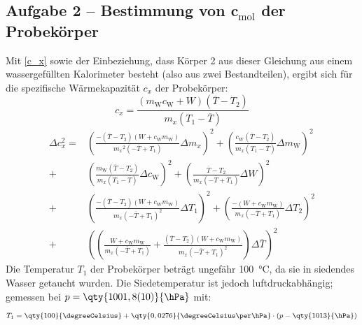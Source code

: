 \subsection[\texorpdfstring{Aufgabe 2 -- Bestimmung von \(c_{\mathrm{mol}}\) der Probekörper}{Aufgabe 2 -- Bestimmung von cmol der Probekörper}]{Aufgabe 2 -- Bestimmung von \(\boldsymbol{c_{\mathrm{mol}}}\) der Probekörper}
Mit \cref{c_x} sowie der Einbeziehung, dass Körper 2 aus dieser Gleichung aus einem wassergefüllten Kalorimeter besteht (also aus zwei Bestandteilen), ergibt sich für die spezifische Wärmekapazität \(c_x\) der Probekörper:
\begin{equation}
    c_x = \frac{(m_{\text{W}} c_{\text{W}} + W)(\overline{T} - T_2)}{m_x (T_1 - \overline{T})}
    \label{c_x_kalorimeter}
\end{equation}
\begin{equation}
    \begin{aligned}
        \Delta c_x^{2} = &\left(\frac{-\left(\overline{T}-T_2\right) \left(W+c_{\text{W}} m_{\text{W}}\right)}{{m_x}^2 \left(-\overline{T}+T_1\right)} \Delta m_x\right)^2 + \left(\frac{c_{\text{W}}(\overline{T}-T_2)}{m_x (T_1-\overline{T})}\Delta m_{\text{W}}\right)^2 \\
        + &\left(\frac{m_{\text{W}}(\overline{T}-T_2)}{m_x (T_1-\overline{T})}\Delta c_{\text{W}}\right)^2 + \left(\frac{\overline{T}-T_2}{m_x \left(-\overline{T}+T_1\right)} \Delta W\right)^2 \\
        + &\left(\frac{-\left(\overline{T}-T_2\right) \left(W+c_{\text{W}} m_{\text{W}}\right)}{m_x \left(-\overline{T}+T_1\right)^2} \Delta T_1\right)^2 + \left(\frac{-\left(W+c_{\text{W}} m_{\text{W}}\right)}{m_x \left(-\overline{T}+T_1\right)} \Delta T_2\right)^2 \\
        + &\left(\left(\frac{W+c_{\text{W}} m_{\text{W}}}{m_x \left(-\overline{T}+T_1\right)} + \frac{\left(\overline{T}-T_2\right) \left(W+c_{\text{W}} m_{\text{W}}\right)}{m_x \left(-\overline{T}+T_1\right)^2}\right) \Delta \overline{T}\right)^2
    \end{aligned}
    \label{c_x_fehler}
\end{equation}
Die Temperatur \(T_1\) der Probekörper beträgt ungefähr \qty{100}{\degreeCelsius}, da sie in siedendes Wasser getaucht wurden. Die Siedetemperatur ist jedoch luftdruckabhängig; gemessen bei \(p = \qty{1001,8(10)}{\hPa}\) mit:
\begin{equation}
    T_1 = \qty{100}{\degreeCelsius} + \qty{0,0276}{\degreeCelsius\per\hPa} \cdot \left(p - \qty{1013}{\hPa}\right)
    \label{luftdruck}
\end{equation}
